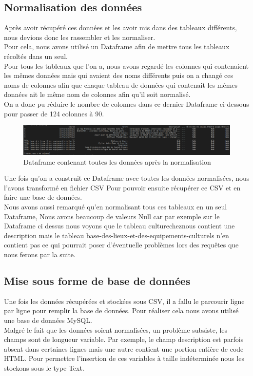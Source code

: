 \documentclass{article}
\begin{document}
\subsection{Normalisation des données}
Après avoir récupéré ces données et les avoir mis dans des tableaux différents, nous devions donc les rassembler et les normaliser.\\
Pour cela, nous avons utilisé un Dataframe afin de mettre tous les tableaux récoltés dans un seul.\\
Pour tous les tableaux que l’on a, nous avons regardé les colonnes qui contenaient les mêmes données mais qui avaient des noms différents puis on a changé ces noms de colonnes afin que chaque tableau de données qui contenait les mêmes données ait le même nom de colonnes afin qu’il soit normalisé.\\
On a donc pu réduire le nombre de colonnes dans ce dernier Dataframe ci-dessous pour passer de 124 colonnes à 90.

\begin{figure}[H]
\hspace{-25mm}
\includegraphics[scale = 0.35]{images/dataframe_final.png}
\caption{Dataframe contenant toutes les données après la normalisation}
\end{figure}
Une fois qu’on a construit ce Dataframe avec toutes les données normalisées, nous l’avons transformé en fichier CSV Pour pouvoir ensuite récupérer ce CSV et en faire une base de données.\\
Nous avons aussi remarqué qu’en normalisant tous ces tableaux en un seul Dataframe, Nous avons beaucoup de valeurs Null car par exemple sur le Dataframe ci dessus nous voyons que le tableau culturecheznous contient une description mais le tableau base-des-lieux-et-des-equipements-culturels n’en contient pas ce qui pourrait poser d'éventuelle problèmes lors des requêtes que nous ferons par la suite.

\subsection{Mise sous forme de base de données}
Une fois les données récupérées et stockées sous CSV, il a fallu le parcourir ligne par ligne pour remplir la base de données. Pour réaliser cela nous avons utilisé une base de données MySQL.\\
Malgré le fait que les données soient normalisées, un problème subsiste, les champs sont de longueur variable. Par exemple, le champ description est parfois absent dans certaines lignes mais une autre contient une portion entière de code HTML. Pour permettre l’insertion de ces variables à taille indéterminée nous les stockons sous le type Text.
\end{document}
